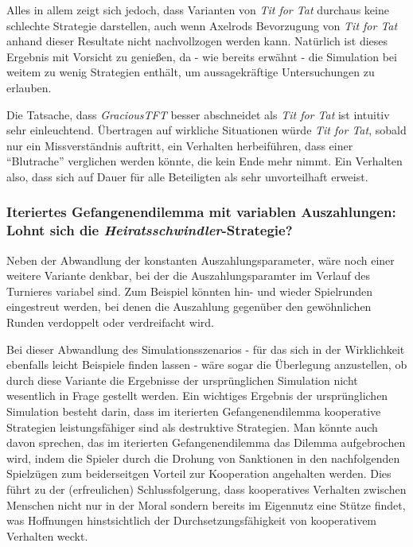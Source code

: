 \documentclass[12pt,a4paper,ngerman]{article}
\begin{document}
Alles in allem zeigt sich jedoch, dass Varianten von {\em Tit for Tat}
durchaus keine schlechte Strategie darstellen, auch wenn Axelrods
Bevorzugung von {\em Tit for Tat} anhand dieser Resultate nicht
nachvollzogen werden kann. Natürlich ist dieses Ergebnis mit Vorsicht
zu genießen, da - wie bereits erwähnt - die Simulation bei weitem zu
wenig Strategien enthält, um aussagekräftige Untersuchungen zu
erlauben.

Die Tatsache, dass {\em GraciousTFT} besser abschneidet als {\em Tit
for Tat} ist intuitiv sehr einleuchtend. Übertragen auf wirkliche
Situationen würde {\em Tit for Tat}, sobald nur ein Missverständnis
auftritt, ein Verhalten herbeiführen, dass einer "`Blutrache"'
verglichen werden könnte, die kein Ende mehr nimmt. Ein Verhalten also, 
dass sich auf Dauer für alle Beteiligten als sehr unvorteilhaft erweist.


\subsubsection{Iteriertes Gefangenendilemma mit variablen Auszahlungen: Lohnt sich die
  {\em Heiratsschwindler}-Strategie?}

Neben der Abwandlung der konstanten Auszahlungsparameter, wäre noch
einer weitere Variante denkbar, bei der die Auszahlungsparamter im
Verlauf des Turnieres variabel sind. Zum Beispiel könnten hin- und
wieder Spielrunden eingestreut werden, bei denen die Auszahlung
gegenüber den gewöhnlichen Runden verdoppelt oder verdreifacht wird.

Bei dieser Abwandlung des Simulationsszenarios - für das sich in
der Wirklichkeit ebenfalls leicht Beispiele finden lassen - wäre sogar
die Überlegung anzustellen, ob durch diese Variante die Ergebnisse der
ursprünglichen Simulation nicht wesentlich in Frage gestellt
werden. Ein wichtiges Ergebnis der ursprünglichen
Simulation besteht darin, dass im iterierten Gefangenendilemma
kooperative Strategien leistungsfähiger sind als destruktive Strategien. Man
könnte auch davon sprechen, das im iterierten Gefangenendilemma das Dilemma
aufgebrochen wird, indem die Spieler durch die Drohung von Sanktionen in den
nachfolgenden Spielzügen zum beiderseitgen Vorteil zur Kooperation angehalten
werden. Dies führt zu der (erfreulichen) Schlussfolgerung, dass kooperatives
Verhalten zwischen Menschen nicht nur in der Moral sondern bereits im
Eigennutz eine Stütze findet, was Hoffnungen hinstsichtlich der
Durchsetzungsfähigkeit von kooperativem Verhalten weckt. 
\end{document}
